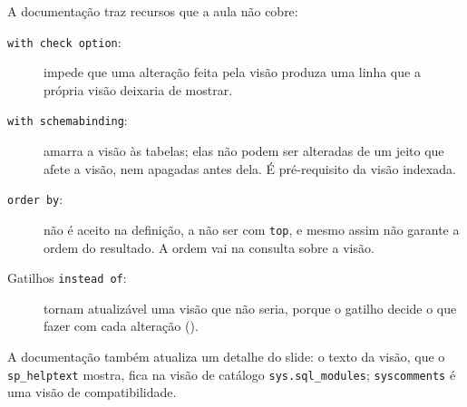 A documentação traz recursos que a aula não
cobre:

\begin{description}
	\item[\texttt{with check option}:] impede que uma alteração feita pela
	visão produza uma linha que a própria visão deixaria de mostrar.
	\item[\texttt{with schemabinding}:] amarra a visão às tabelas; elas não
	podem ser alteradas de um jeito que afete a visão, nem apagadas antes
	dela. É pré-requisito da visão indexada.
	\item[\texttt{order by}:] não é aceito na definição, a não ser com
	\texttt{top}, e mesmo assim não garante a ordem do resultado. A ordem
	vai na consulta sobre a visão.
	\item[Gatilhos \texttt{instead of}:] tornam atualizável uma visão que
	não seria, porque o gatilho decide o que fazer com cada alteração
	().
\end{description}

A documentação também atualiza um detalhe do slide: o texto da visão,
que o \texttt{sp\_helptext} mostra, fica na visão de catálogo
\texttt{sys.sql\_modules}; \texttt{syscomments} é uma visão de
compatibilidade.
